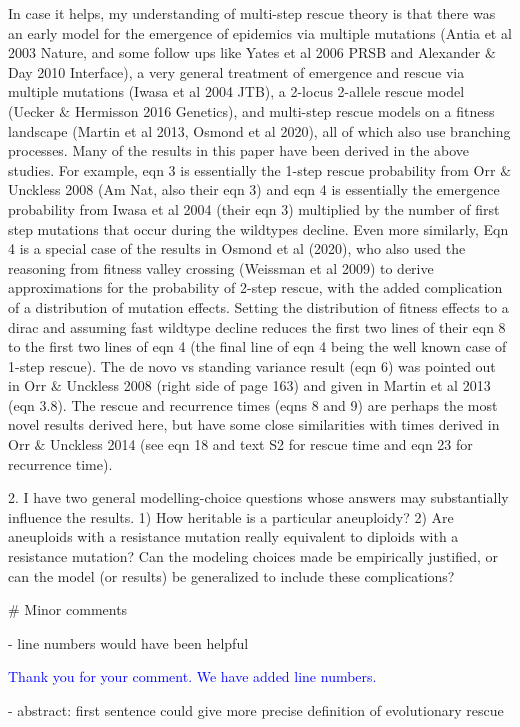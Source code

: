 \documentclass[11pt,a4paper]{article}
\begin{document}
In case it helps, my understanding of multi-step rescue theory is that there was an early model for the emergence of epidemics via multiple mutations (Antia et al 2003 Nature, and some follow ups like Yates et al 2006 PRSB and Alexander $\&$ Day 2010 Interface), a very general treatment of emergence and rescue via multiple mutations (Iwasa et al 2004 JTB), a 2-locus 2-allele rescue model (Uecker $\&$ Hermisson 2016 Genetics), and multi-step rescue models on a fitness landscape (Martin et al 2013, Osmond et al 2020), all of which also use branching processes. Many of the results in this paper have been derived in the above studies. For example, eqn 3 is essentially the 1-step rescue probability from Orr $\&$ Unckless 2008 (Am Nat, also their eqn 3) and eqn 4 is essentially the emergence probability from Iwasa et al 2004 (their eqn 3) multiplied by the number of first step mutations that occur during the wildtypes decline. Even more similarly, Eqn 4 is a special case of the results in Osmond et al (2020), who also used the reasoning from fitness valley crossing (Weissman et al 2009) to derive approximations for the probability of 2-step rescue, with the added complication of a distribution of mutation effects. Setting the distribution of fitness effects to a dirac and assuming fast wildtype decline reduces the first two lines of their eqn 8 to the first two lines of eqn 4 (the final line of eqn 4 being the well known case of 1-step rescue). The de novo vs standing variance result (eqn 6) was pointed out in Orr $\&$ Unckless 2008 (right side of page 163) and given in Martin et al 2013 (eqn 3.8). The rescue and recurrence times (eqns 8 and 9) are perhaps the most novel results derived here, but have some close similarities with times derived in Orr $\&$ Unckless 2014 (see eqn 18 and text S2 for rescue time and eqn 23 for recurrence time).

2. I have two general modelling-choice questions whose answers may substantially influence the results. 1) How heritable is a particular aneuploidy? 2) Are aneuploids with a resistance mutation really equivalent to diploids with a resistance mutation? Can the modeling choices made be empirically justified, or can the model (or results) be generalized to include these complications?

$\#$ Minor comments

- line numbers would have been helpful

\textcolor{blue}{Thank you for your comment. We have added line numbers.} 

- abstract: first sentence could give more precise definition of evolutionary rescue
\end{document}
